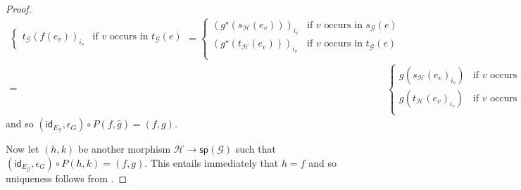 \documentclass[3p]{elsarticle}
\renewcommand{\sp}{\mathsf{sp}}
\newcommand{\id}[1]{\mathsf{id}_{#1}}
\theoremstyle{remark}
\theoremstyle{definition}
\begin{document}
\begin{proof}
\begin{align*}
\begin{cases}
			t_{\mathcal{G}}(f(e_v))_{i_v}& \text{if } v \text{ occurs in } t_{\mathcal{G}}(e)
		\end{cases}= \begin{cases}
		(g^\star(s_{\mathcal{H}}(e_v)))_{i_v}& \text{if } v \text{ occurs in } s_{\mathcal{G}}(e)\\
		(g^\star(t_{\mathcal{H}}(e_v)))_{i_v}& \text{if } v \text{ occurs in } t_{\mathcal{G}}(e)\\
		\end{cases}\\=&\begin{cases}
		g(s_{\mathcal{H}}(e_v)_{i_v})& \text{if } v \text{ occurs in } s_{\mathcal{G}}(e)\\
		g(t_{\mathcal{H}}(e_v)_{i_v})& \text{if } v \text{ occurs in } t_{\mathcal{G}}(e)\\
		\end{cases}=g(v)
	\end{align*}
and so $(\id{E_{\mathcal{G}}}, \epsilon_{G})\circ P(f, \hat{g})=(f,g)$.
	 
	Now let $(h,k)$ be another morphism $\mathcal{H}\to \sp(\mathcal{G})$ such that $(\id{E_{\mathcal{G}}}, \epsilon_{G})\circ P(h, k)=(f,g)$. This entails immediately that $h =f$ and so uniqueness follows from .	
\end{proof}
\end{document}
